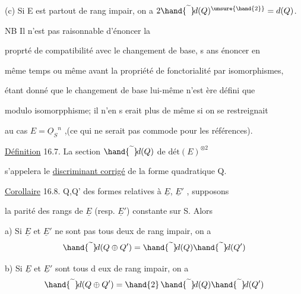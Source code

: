 
(c) Si E est partout de rang impair, on a $2\hand{\widetilde{\phantom{d}}}\!d(Q)^{\unsure{\hand{2}}} = d(Q)$.


 \quad NB Il n'est pas raisonnable d'énoncer la

proprté de compatibilité avec le changement de base, s ans énoncer en

même temps\hand{,} ou même avant\hand{,} la propriété de fonctorialité par isomorphismes,

étant donné que le changement de base  lui-même n'est ère défini que

modulo isomorpphisme; il n'en s erait plus de même si on se restreignait

au cas $E = \underline{O}_S{}^n$ ,(ce qui ne serait pas commode pour les références).

 \quad \uline{Définition} 16.7. La section $\hand{\widetilde{\phantom{d}}}\!d(Q)$ de $\text{dét}(E)^{\otimes 2}$

s'appelera le \uline{discriminant corrigé} de la forme quadratique Q.

\uline{Corollaire} 16.8.  Q,Q' des formes relatives à $\underline{E}$, $\underline{E}'$ , supposons

la parité des rangs de $\underline{E}$ (resp. $\underline{E}'$) constante sur S. Alors

a) Si $\underline{E}$ et $\underline{E}'$ ne sont pas tous deux de rang impair, on a
\[ \hand{\widetilde{\phantom{d}}}\!d(Q \oplus Q') = \hand{\widetilde{\phantom{d}}}\!d(Q)\hand{\widetilde{\phantom{d}}}\!d(Q') \]

b) Si $\underline{E}$ et $\underline{E}'$ sont tous d eux de rang impair, on a
\[ \hand{\widetilde{\phantom{d}}}\!d(Q \oplus Q') = \hand{2}\,\hand{\widetilde{\phantom{d}}}\!d(Q)\hand{\widetilde{\phantom{d}}}\!d(Q') \]

